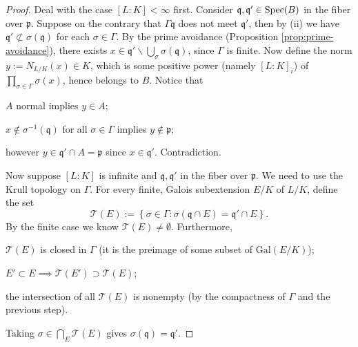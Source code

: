 \begin{proof}
	Deal with the case $[L:K] < \infty$ first. Consider $\mathfrak{q}, \mathfrak{q}' \in \operatorname{Spec}(B)$ in the fiber over $\mathfrak{p}$. Suppose on the contrary that $\Gamma \mathfrak{q}$ does not meet $\mathfrak{q}'$, then by (ii) we have $\mathfrak{q}' \not\subset \sigma(\mathfrak{q})$ for each $\sigma \in \Gamma$. By the prime avoidance (Proposition \ref{prop:prime-avoidance}), there exists $x \in \mathfrak{q}' \smallsetminus \bigcup_\sigma \sigma(\mathfrak{q})$, since $\Gamma$ is finite. Now define the norm $y := N_{L/K}(x) \in K$, which is some positive power (namely $[L:K]_i$) of $\prod_{\sigma \in \Gamma} \sigma(x)$, hence belongs to $B$. Notice that
	\begin{compactitem}
		\item $A$ normal implies $y \in A$;
		\item $x \notin \sigma^{-1}(\mathfrak{q})$ for all $\sigma \in \Gamma$ implies $y \notin \mathfrak{p}$;
		\item however $y \in \mathfrak{q}' \cap A = \mathfrak{p}$ since $x \in \mathfrak{q}'$. Contradiction.
	\end{compactitem}
	
	Now suppose $[L:K]$ is infinite and $\mathfrak{q}, \mathfrak{q}'$ in the fiber over $\mathfrak{p}$. We need to use the Krull topology on $\Gamma$. For every finite, Galois subextension $E/K$ of $L/K$, define the set
	\[ \mathcal{T}(E) := \left\{ \sigma \in \Gamma: \sigma(\mathfrak{q} \cap E) = \mathfrak{q}' \cap E \right\}.  \]
	By the finite case we know $\mathcal{T}(E) \neq \emptyset$. Furthermore,
	\begin{compactitem}
		\item $\mathcal{T}(E)$ is closed in $\Gamma$ (it is the preimage of some subset of $\text{Gal}(E/K)$);
		\item $E' \subset E \implies \mathcal{T}(E') \supset \mathcal{T}(E)$;
		\item the intersection of all $\mathcal{T}(E)$ is nonempty (by the compactness of $\Gamma$ and the previous step).
	\end{compactitem}
	Taking $\sigma \in \bigcap_E \mathcal{T}(E)$ gives $\sigma(\mathfrak{q}) = \mathfrak{q}'$.


\end{proof}
